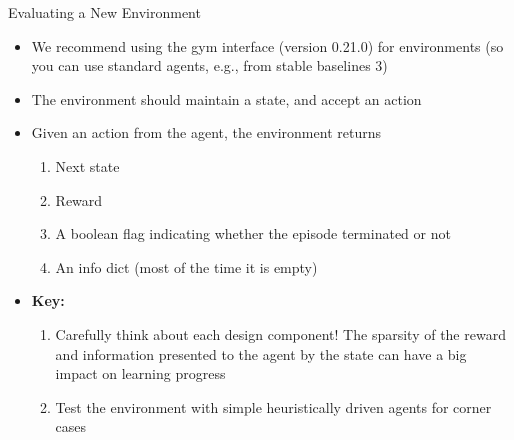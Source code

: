 \documentclass[aspectratio=169]{../latex_main/tntbeamer}  %
\begin{document}

\begin{frame}[c]{Evaluating a New Environment}

    \begin{itemize}
        \item We recommend using the gym interface (version 0.21.0) for environments (so you can use standard agents, e.g., from stable baselines 3)
        \vfill
        \item The environment should maintain a state, and accept an action
        \vfill
        \item Given an action from the agent, the environment returns 
            \begin{enumerate}
                \item Next state
                \item Reward
                \item A boolean flag indicating whether the episode terminated or not
				\item An info dict (most of the time it is empty)
            \end{enumerate}
        \vfill
        \item \textbf{Key:} 
        \begin{enumerate}
            \item Carefully think about each design component! The sparsity of the reward and information presented to the agent by the state can have a big impact on learning progress
            \item Test the environment with simple heuristically driven agents for corner cases
        \end{enumerate}
    \end{itemize}

\end{frame}

\end{document}
